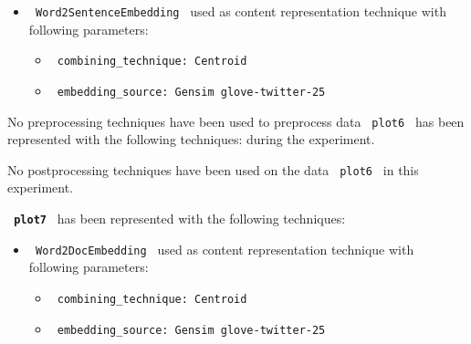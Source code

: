 \documentclass[11pt]{article}
\begin{document}
\begin{itemize}
                                                            
            \item
        \verb| Word2SentenceEmbedding | used as content representation technique with following parameters:
        \begin{itemize}
                            \item
                \verb| combining_technique: Centroid|
                            \item
                \verb| embedding_source: Gensim glove-twitter-25|
                    \end{itemize}
    \end{itemize}
\hfill\break
\hfill\break



No preprocessing techniques have been used to preprocess data \lstinline[style=verbatim-text]| plot6 | has been represented with the following techniques:
 during the experiment.
\hfill\break
\hfill\break



No postprocessing techniques have been used on the data \lstinline[style=verbatim-text]| plot6 | in this experiment.
\hfill\break
\hfill\break



\textbf{\lstinline[style=verbatim-text]| plot7 |} has been represented with the following techniques:
\hfill\break
\hfill\break

\begin{itemize}
                                                            
            \item
        \verb| Word2DocEmbedding | used as content representation technique with following parameters:
        \begin{itemize}
                            \item
                \verb| combining_technique: Centroid|
                            \item
                \verb| embedding_source: Gensim glove-twitter-25|
                    \end{itemize}
    \end{itemize}
\hfill\break
\hfill\break
\end{document}
